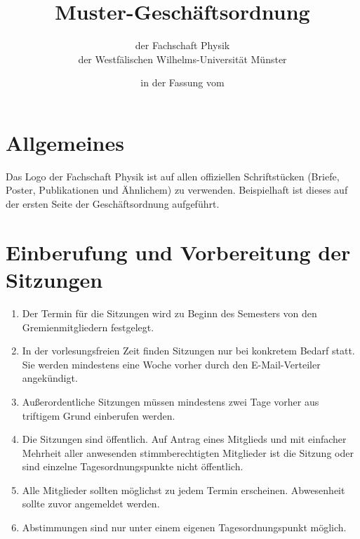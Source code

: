 


\pagestyle{scrheadings}

\title{Muster-Geschäftsordnung}
\subtitle{der Fachschaft Physik\\
der Westfälischen Wilhelms-Universität Münster}
\date{in der Fassung vom }
\author{}



\maketitle

\section{Allgemeines}
Das Logo der Fachschaft Physik ist auf allen offiziellen Schriftstücken (Briefe, Poster, Publikationen und Ähnlichem) zu verwenden.
Beispielhaft ist dieses auf der ersten Seite der Geschäftsordnung aufgeführt.

\section{Einberufung und Vorbereitung der Sitzungen}
\begin{enumerate}
	\item Der Termin für die Sitzungen wird zu Beginn des Semesters von den Gremienmitgliedern festgelegt.
	\item In der vorlesungsfreien Zeit finden Sitzungen nur bei konkretem Bedarf statt.
	Sie werden mindestens eine Woche vorher durch den E-Mail-Verteiler angekündigt.
	\item Außerordentliche Sitzungen müssen mindestens zwei Tage vorher aus triftigem Grund einberufen werden.
	\item Die Sitzungen sind öffentlich.
	Auf Antrag eines Mitglieds und mit einfacher Mehrheit aller anwesenden stimmberechtigten Mitglieder ist die Sitzung oder sind einzelne Tagesordnungspunkte nicht öffentlich.
	\item Alle Mitglieder sollten möglichst zu jedem Termin erscheinen.
	Abwesenheit sollte zuvor angemeldet werden.
	\item Abstimmungen sind nur unter einem eigenen Tagesordnungspunkt möglich.
\end{enumerate}

